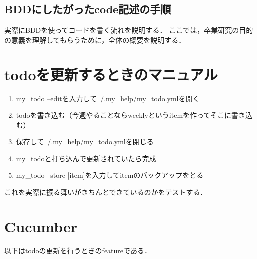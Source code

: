 
\subsection{BDDにしたがったcode記述の手順}
実際にBDDを使ってコードを書く流れを説明する．
ここでは，卒業研究の目的の意義を理解してもらうために，全体の概要を説明する．

\section{todoを更新するときのマニュアル}
\begin{enumerate}
\item my\_todo --editを入力して~/.my\_help/my\_todo.ymlを開く
\item todoを書き込む（今週やることならweeklyというitemを作ってそこに書き込む）
\item 保存して~/.my\_help/my\_todo.ymlを閉じる
\item my\_todoと打ち込んで更新されていたら完成
\item my\_todo --store [item]を入力してitemのバックアップをとる
\end{enumerate}
これを実際に振る舞いがきちんとできているのかをテストする．

\section{Cucumber}
以下はtodoの更新を行うときのfeatureである．

